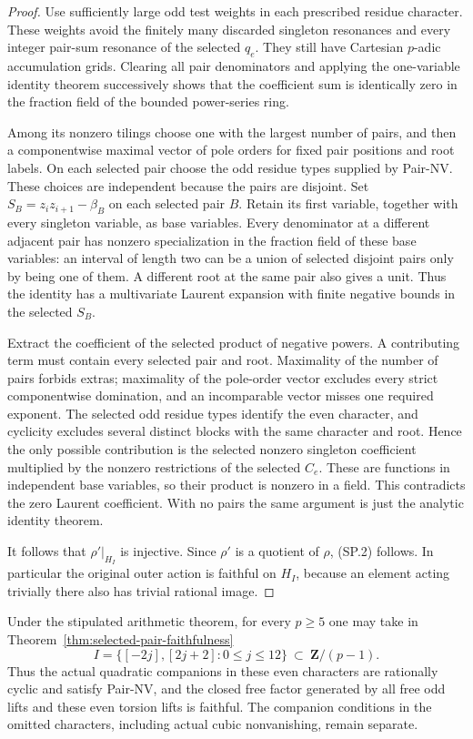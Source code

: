\begin{proof}
Use sufficiently large odd test weights in each prescribed
residue character. These weights avoid the finitely many
discarded singleton resonances and every integer pair-sum
resonance of the selected $q_e$. They still have Cartesian
$p$-adic accumulation grids. Clearing all pair denominators
and applying the one-variable identity theorem successively
shows that the coefficient sum is identically zero in the
fraction field of the bounded power-series ring.

Among its nonzero tilings choose one with the largest number
of pairs, and then a componentwise maximal vector of pole
orders for fixed pair positions and root labels. On each
selected pair choose the odd residue types supplied by
Pair-NV. These choices are independent because the pairs
are disjoint. Set $S_B=z_i z_{i+1}-\beta_B$ on each selected
pair $B$. Retain its first variable, together with every
singleton variable, as base variables. Every denominator at
a different adjacent pair has nonzero specialization in the
fraction field of these base variables: an interval of length
two can be a union of selected disjoint pairs only by being
one of them. A different root at the same pair also gives a
unit. Thus the identity has a multivariate Laurent expansion
with finite negative bounds in the selected $S_B$.

Extract the coefficient of the selected product of negative
powers. A contributing term must contain every selected pair
and root. Maximality of the number of pairs forbids extras;
maximality of the pole-order vector excludes every strict
componentwise domination, and an incomparable vector misses
one required exponent. The selected odd residue types identify
the even character, and cyclicity excludes several distinct
blocks with the same character and root. Hence the only
possible contribution is the selected nonzero singleton
coefficient multiplied by the nonzero restrictions of the
selected $C_e$. These are functions in independent base
variables, so their product is nonzero in a field. This
contradicts the zero Laurent coefficient. With no pairs the
same argument is just the analytic identity theorem.

It follows that $\rho'|_{H_I}$ is injective. Since $\rho'$
is a quotient of $\rho$, (SP.2) follows. In particular the
original outer action is faithful on $H_I$, because an
element acting trivially there also has trivial rational image.
\end{proof}

\begin{corollary}
\label{cor:selected-arithmetic-range}
Under the stipulated arithmetic theorem, for every $p\geq5$
one may take in Theorem~\ref{thm:selected-pair-faithfulness}
\[
 I=\{[-2j],[2j+2]:0\leq j\leq12\}
        \ \subset\ \mathbf Z/(p-1).
 \tag{SP.5}
\]
Thus the actual quadratic companions in these even characters
are rationally cyclic and satisfy Pair-NV, and the closed free
factor generated by all free odd lifts and these even torsion
lifts is faithful. The companion conditions in the omitted
characters, including actual cubic nonvanishing, remain separate.
\end{corollary}

